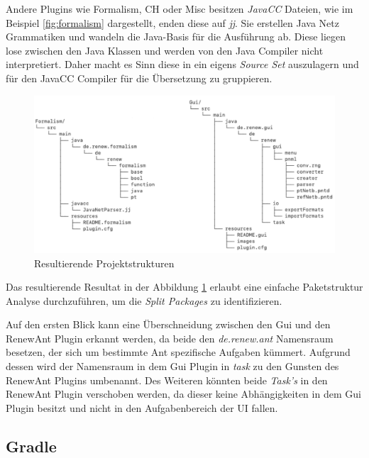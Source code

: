 	Andere Plugins wie Formalism, CH oder Misc besitzen \textit{JavaCC} Dateien, wie im Beispiel \ref{fig:formalism} dargestellt, enden diese auf \textit{jj}. Sie erstellen Java Netz Grammatiken und wandeln die Java-Basis für die Ausführung ab. Diese liegen lose zwischen den Java Klassen und werden von den Java Compiler nicht interpretiert. Daher macht es Sinn diese in ein eigens \textit{Source Set} auszulagern und für den JavaCC Compiler für die Übersetzung zu gruppieren.

	\begin{figure}[h!]
	  \centering
	  \includegraphics[width=\textwidth]{material/images/form-gui.png}
	  \caption{Resultierende Projektstrukturen}
	  \label{fig:resultStr}
	\end{figure}

	Das resultierende Resultat in der Abbildung \ref{fig:resultStr} erlaubt eine einfache Paketstruktur Analyse durchzuführen, um die \textit{Split Packages} zu identifizieren. \newline


	Auf den ersten Blick kann eine Überschneidung zwischen den Gui und den RenewAnt Plugin erkannt werden, da beide den \textit{de.renew.ant} Namensraum besetzen, der sich um bestimmte Ant spezifische Aufgaben kümmert. Aufgrund dessen wird der Namensraum in dem Gui Plugin in \textit{task} zu den Gunsten des RenewAnt Plugins umbenannt. Des Weiteren könnten beide \textit{Task's} in den RenewAnt Plugin verschoben werden, da dieser keine Abhängigkeiten in dem Gui Plugin besitzt und nicht in den Aufgabenbereich der UI fallen. 

\subsection{Gradle}

